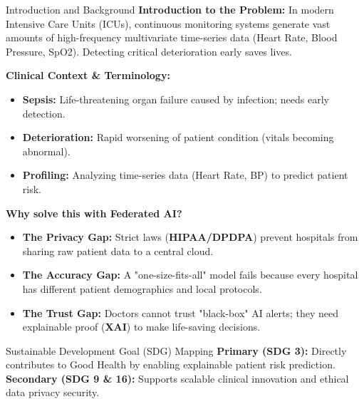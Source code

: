 \documentclass[aspectratio=169, 11pt]{beamer}
\begin{document}
\begin{frame}{Introduction and Background}
    \textbf{Introduction to the Problem:}
    \scriptsize 
    In modern Intensive Care Units (ICUs), continuous monitoring systems generate vast amounts of high-frequency multivariate time-series data (Heart Rate, Blood Pressure, SpO2). Detecting critical deterioration early saves lives.

    \vspace{0.2cm}
    \textbf{Clinical Context \& Terminology:}
    \begin{itemize}
        \item \textbf{Sepsis:} Life-threatening organ failure caused by infection; needs early detection.
        \item \textbf{Deterioration:} Rapid worsening of patient condition (vitals becoming abnormal).
        \item \textbf{Profiling:} Analyzing time-series data (Heart Rate, BP) to predict patient risk.
    \end{itemize}

    \vspace{0.2cm}
    \textbf{Why solve this with Federated AI?}
    \begin{itemize}
        \scriptsize 
        \item \textbf{The Privacy Gap:} Strict laws (\textbf{HIPAA/DPDPA}) prevent hospitals from sharing raw patient data to a central cloud.
        \item \textbf{The Accuracy Gap:} A "one-size-fits-all" model fails because every hospital has different patient demographics and local protocols.
        \item \textbf{The Trust Gap:} Doctors cannot trust "black-box" AI alerts; they need explainable proof (\textbf{XAI}) to make life-saving decisions.
    \end{itemize}

    \vspace{0.2cm}
    \begin{block}{Sustainable Development Goal (SDG) Mapping}
        \scriptsize
        \textbf{Primary (SDG 3):} Directly contributes to Good Health by enabling explainable patient risk prediction. \\
        \textbf{Secondary (SDG 9 \& 16):} Supports scalable clinical innovation and ethical data privacy security.
    \end{block}
\end{frame}
\end{document}
